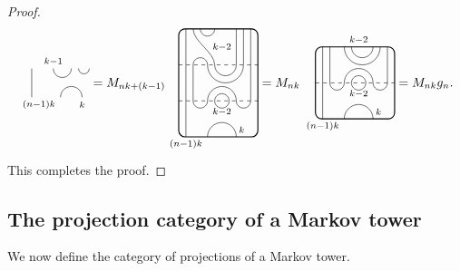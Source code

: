 \documentclass[11pt]{article}
\theoremstyle{plain}
\theoremstyle{definition}
\begin{document}
\begin{proof}
$$\begin{tikzpicture}[baseline = .3cm]
	\draw (.2,0) -- (.2,.8);
	\draw (.8,.8) arc (-180:0:.25cm);
	\draw (1.5,.8) arc (-180:0:.15cm);
	\draw (1,0) arc (180:0:.3cm);
	\node at (.8,1) {\scriptsize{$k{-}1$}};
	\node at (1.6,-.2) {\scriptsize{$k$}};
	\node at (.4,-.2) {\scriptsize{$(n{-}1)k$}};
\end{tikzpicture}
=
M_{nk+(k-1)}
\begin{tikzpicture}[baseline = 1.4cm]
	\draw[thick, rounded corners = 5pt] (0,0) rectangle (2.2,3);
	\draw (.2,0) -- (.2,3);
	\draw (.6,3) arc (-180:0:.2cm);
	\draw (.4,3) .. controls ++(270:.35cm) and ++(90:.35cm) .. (1,2) arc (-180:0:.3cm) -- (1.6,3);
	\draw (1.8,3) -- (1.8,2) arc (0:-180:.5cm) arc (0:180:.2cm) -- (.4,1) arc (-180:0:.2cm) arc (180:0:.4cm) arc (-180:0:.2cm) -- (2,3);
	\draw (1.2,1) circle (.2cm);
	\draw (.8,0) arc (180:0:.4cm);
	\draw[dashed] (0,1) -- (2.2,1);
	\draw[dashed] (0,2) -- (2.2,2);
	\node at (1.2,.7) {\scriptsize{$k{-}2$}};
	\node at (1.2,2.5) {\scriptsize{$k{-}2$}};
	\node at (1.75,.2) {\scriptsize{$k$}};
	\node at (.2,-.2) {\scriptsize{$(n{-}1)k$}};
\end{tikzpicture}
=
M_{nk}\,
\begin{tikzpicture}[baseline = .9cm]
	\draw[thick, rounded corners = 5pt] (0,0) rectangle (2.2,2);
	\draw (.2,0) -- (.2,2);
	\draw (1,2) arc (-180:0:.3cm);
	\draw (1.8,2) arc (0:-180:.5cm); 
	\draw (.4,2) -- (.4,1) arc (-180:0:.2cm) arc (180:0:.4cm) arc (-180:0:.2cm) -- (2,2);
	\draw (1.2,1) circle (.2cm);
	\draw (.8,0) arc (180:0:.4cm);
	\draw[dashed] (0,1) -- (2.2,1);
	\node at (1.2,.7) {\scriptsize{$k{-}2$}};
	\node at (1.2,2.2) {\scriptsize{$k{-}2$}};
	\node at (1.75,.2) {\scriptsize{$k$}};
	\node at (.2,-.2) {\scriptsize{$(n{-}1)k$}};
\end{tikzpicture}
=
M_{nk} g_n.
$$
This completes the proof.
\end{proof}



\subsection{The projection category of a Markov tower}

We now define the category of projections of a Markov tower. 
\end{document}
